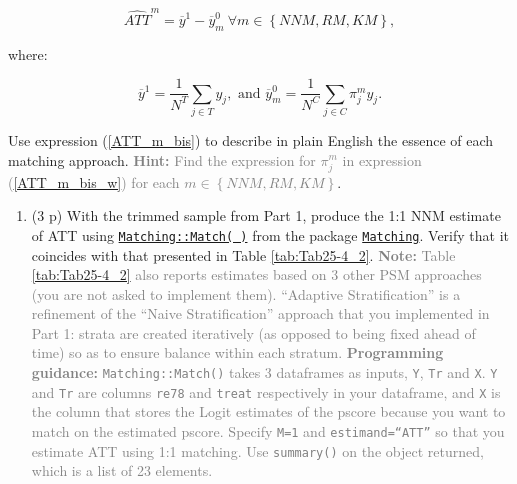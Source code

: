 \documentclass[
]{article}
\providecommand{\tightlist}{%
  \setlength{\itemsep}{0pt}\setlength{\parskip}{0pt}}
\begin{document}
\begin{equation} \label{ATT_m_bis}
\widehat{ATT}^{m} =\overline{y}^{1}-\overline{y}_{m}^{0} \ \forall m\in \left\{ NNM,RM,KM\right\},
\end{equation}

\noindent where:

\begin{equation}\label{ATT_m_bis_w}
\overline{y}^{1} =\frac{1}{N^{T}}\sum_{j \in T}y_{j}, \text{     and      }  \overline{y}_{m}^{0} =\frac{1}{N^{C}}\sum_{j \in C}\pi_{j}^{m}y_{j}.
\end{equation}

\noindent Use expression (\ref{ATT_m_bis}) to describe in plain English
the essence of each matching approach.
\textcolor{gray}{\textbf{Hint:} Find the expression for $\pi _{j}^{m}$ in expression (\ref{ATT_m_bis_w}) for each $m\in \left\{NNM,RM,KM\right\} $}.

\begin{enumerate}
\def\labelenumi{\arabic{enumi}.}
\setcounter{enumi}{5}
\tightlist
\item
  (3 p) With the trimmed sample from Part 1, produce the 1:1 NNM
  estimate of ATT using
  \href{https://www.rdocumentation.org/packages/Matching/versions/4.9-6/topics/Match}{\texttt{Matching::Match( )}}
  from the package
  \href{https://cran.r-project.org/web/packages/Matching/Matching.pdf}{\texttt{Matching}}.
  Verify that it coincides with that presented in Table
  \ref{tab:Tab25-4_2}.
  \textcolor{gray}{\textbf{Note:} Table \ref{tab:Tab25-4_2} also reports estimates based on 3 other PSM approaches (you are not asked to implement them). ``Adaptive Stratification'' is a refinement of the ``Naive Stratification'' approach that you implemented in Part 1: strata are created iteratively (as opposed to being fixed ahead of time) so as to ensure balance within each stratum.}
  \textcolor{gray}{\textbf{Programming guidance:} \texttt{Matching::Match()} takes 3 dataframes as inputs, \texttt{Y}, \texttt{Tr} and \texttt{X}. \texttt{Y} and \texttt{Tr} are columns \texttt{re78} and \texttt{treat} respectively in your dataframe, and \texttt{X} is the column that stores the Logit estimates of the pscore because you want to match on the estimated pscore. Specify \texttt{M=1} and \texttt{estimand=``ATT''} so that you estimate ATT using 1:1 matching. Use \texttt{summary()} on the object returned, which is a list of 23 elements.}
  \label{item:estimate-att-ncs}
\end{enumerate}
\end{document}
